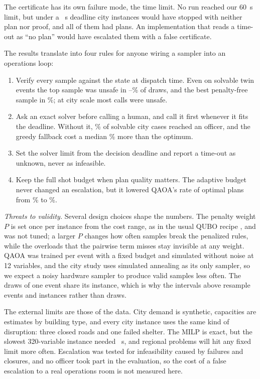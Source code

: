 \documentclass[conference]{IEEEtran}
\begin{document}
The certificate has its own failure mode, the time limit. No run reached our 60~s limit, but under a \DeadlineS~s deadline \DeadlineN{} city instances would have stopped with neither plan nor proof, and all of them had plans. An implementation that reads a time-out as ``no plan'' would have escalated them with a false certificate.

The results translate into four rules for anyone wiring a sampler into an operations loop:
\begin{enumerate}
\item Verify every sample against the state at dispatch time. Even on solvable twin events the top sample was unsafe in \TwinRawFeasSA--\TwinRawFeasQ\% of draws, and the best penalty-free sample in \BasePfQSol\%; at city scale most calls were unsafe.
\item Ask an exact solver before calling a human, and call it first whenever it fits the deadline. Without it, \CityFalseEsc\% of solvable city cases reached an officer, and the greedy fallback cost a median \CityGreedyGap\% more than the optimum.
\item Set the solver limit from the decision deadline and report a time-out as unknown, never as infeasible.
\item Keep the full shot budget when plan quality matters. The adaptive budget never changed an escalation, but it lowered QAOA's rate of optimal plans from \FixedOptQ\% to \AdaptOptQ\%.
\end{enumerate}

\textit{Threats to validity.} Several design choices shape the numbers. The penalty weight $P$ is set once per instance from the cost range, as in the usual QUBO recipe \cite{Glover2019}, and was not tuned; a larger $P$ changes how often samples break the penalized rules, while the overloads that the pairwise term misses stay invisible at any weight. QAOA was trained per event with a fixed budget and simulated without noise at 12 variables, and the city study uses simulated annealing as its only sampler, so we expect a noisy hardware sampler to produce valid samples less often. The draws of one event share its instance, which is why the intervals above resample events and instances rather than draws.

The external limits are those of the data. City demand is synthetic, capacities are estimates by building type, and every city instance uses the same kind of disruption: three closed roads and one failed shelter. The MILP is exact, but the slowest 320-variable instance needed \MilpSlowS~s, and regional problems will hit any fixed limit more often. Escalation was tested for infeasibility caused by failures and closures, and no officer took part in the evaluation, so the cost of a false escalation to a real operations room is not measured here.
\end{document}
